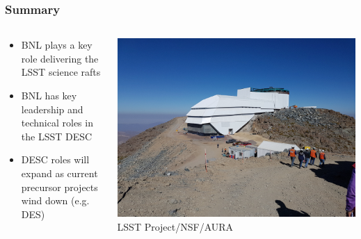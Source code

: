 \documentclass[aspectratio=169]{beamer}
\begin{document}
\frame
{

    \frametitle{Summary}


    \begin{columns}
        \begin{column}{0.4\textwidth}
            \begin{itemize}

                \item BNL plays a key role delivering the LSST science rafts

                \item BNL has key leadership and technical roles in the LSST
                    DESC

                \item DESC roles will expand as current precursor projects
                    wind down (e.g. DES)

            \end{itemize}

        \end{column}
        \begin{column}{0.6\textwidth}
            \centering
                \includegraphics[width=\linewidth]{20180207_101422_scaled.jpg}
                \newline
                {\tiny LSST Project/NSF/AURA}
        \end{column}

    \end{columns}

}
\end{document}
